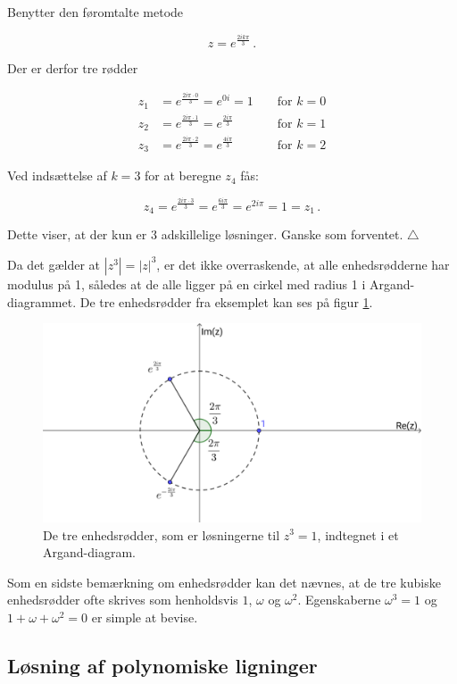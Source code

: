 \documentclass[a4paper, 12pt,titlepage]{article}
\begin{document}
Benytter den føromtalte metode

$$z = e^{\frac{2 i k \pi}{3}} \,.$$

Der er derfor tre rødder

\begin{align*}
    z_1 &= e^{\frac{2 i \pi \cdot 0}{3}} = e^{0i} = 1 & &\text{ for } k=0\\ 
    z_2 &= e^{\frac{2 i \pi \cdot 1}{3}} = e^{\frac{2 i \pi}{3}} & &\text{ for } k=1\\ 
    z_3 &= e^{\frac{2 i \pi \cdot 2}{3}} = e^{\frac{4 i \pi}{3}} & &\text{ for } k=2 
\end{align*}

Ved indsættelse af \(k=3\) for at beregne \(z_4\) fås:

$$z_4 = e^{\frac{2 i \pi \cdot 3}{3}} = e^{\frac{6 i \pi}{3}} = e^{2 i \pi} = 1 =z_1 \,.$$

Dette viser, at der kun er 3 adskillelige løsninger. Ganske som forventet. \(\triangle\)

Da det gælder at \(\left\lvert z^3\right\rvert = |z|^3\), er det ikke overraskende, at alle enhedsrødderne har modulus på 1, således at de alle ligger på en cirkel med radius 1 i Argand-diagrammet. De tre enhedsrødder fra eksemplet kan ses på figur \ref{enhedsroedder}.

\begin{figure}[htbp]
\centering
\includegraphics[width=.9\linewidth]{./img/enhedsroedder.png}
\caption{\label{enhedsroedder}De tre enhedsrødder, som er løsningerne til \(z^3=1\), indtegnet i et Argand-diagram.}
\end{figure}

Som en sidste bemærkning om enhedsrødder kan det nævnes, at de tre kubiske enhedsrødder ofte skrives som henholdsvis \(1\), \(\omega\) og \(\omega^2\). Egenskaberne \(\omega^3=1\) og \(1+\omega+\omega^2 =0\) er simple at bevise.

\subsection{Løsning af polynomiske ligninger}
\label{sec:org74254a3}
\end{document}
